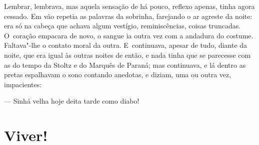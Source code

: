 \begin{linenumbers}
Lembrar, lembrava, mas aquela sensação de há pouco, reflexo apenas,
tinha agora cessado. Em vão repetia as palavras da sobrinha, farejando o
ar agreste da noite: era só na cabeça que achava algum vestígio,
reminiscências, coisas truncadas. O~coração empacara de novo, o sangue
ia outra vez com a andadura do costume. Faltava"-lhe o contato moral da
outra. E~continuava, apesar de tudo, diante da noite, que era igual às
outras noites de então, e nada tinha que se parecesse com as do tempo da
Stoltz e do Marquês de Paraná; mas continuava, e lá dentro as pretas
espalhavam o sono contando anedotas, e diziam, uma ou outra vez,
impacientes:

--- Sinhá velha hoje deita tarde como diabo!

\end{linenumbers}

\chapter{Viver!}

